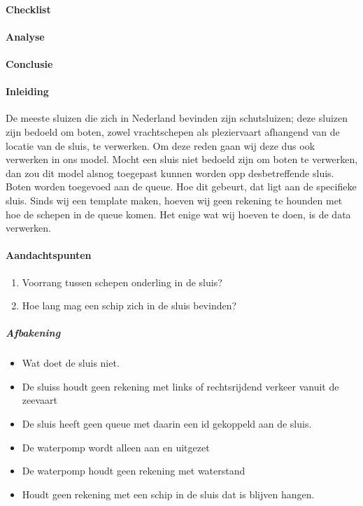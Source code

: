 \paragraph{Checklist}


\paragraph{Analyse}
\paragraph{Conclusie}

\paragraph{Inleiding}

De meeste sluizen die zich in Nederland bevinden zijn schutsluizen; deze sluizen zijn bedoeld om boten, zowel vrachtschepen als pleziervaart afhangend van de locatie van de sluis, te verwerken. Om deze reden gaan wij deze dus ook verwerken in ons model. Mocht een sluis niet bedoeld zijn om boten te verwerken, dan zou dit model alsnog toegepast kunnen worden opp desbetreffende sluis.
Boten worden toegevoed aan de queue. Hoe dit gebeurt, dat ligt aan de specifieke sluis.  Sinds wij een template maken, hoeven wij geen rekening te hounden met hoe de schepen in de queue komen. Het enige wat wij hoeven te doen, is de data verwerken.





\paragraph{Aandachtspunten}
\begin{enumerate}
	\item Voorrang tussen schepen onderling in de sluis?
	\item Hoe lang mag een schip zich in de sluis bevinden?
\end{enumerate} 




\subparagraph{Afbakening}
\begin{itemize}
	\item Wat doet de sluis niet.
	\item De sluiss houdt geen rekening met links of rechtsrijdend verkeer vanuit de zeevaart
	\item De sluis heeft geen queue met daarin een id gekoppeld aan de sluis.
	\item De waterpomp wordt alleen aan en uitgezet
	\item De waterpomp houdt geen rekening met waterstand
	\item Houdt geen rekening met een schip in de sluis dat is blijven hangen.
\end{itemize}


